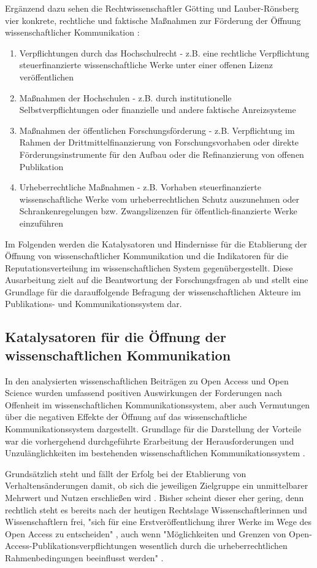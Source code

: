 Ergänzend dazu sehen die Rechtwissenschaftler Götting und Lauber-Rönsberg vier konkrete, rechtliche und faktische Maßnahmen zur Förderung der Öffnung wissenschaftlicher Kommunikation \cite{Goetting_2015}:
\begin{enumerate}
\item Verpflichtungen durch das Hochschulrecht - z.B. eine rechtliche Verpflichtung steuerfinanzierte wissenschaftliche Werke unter einer offenen Lizenz veröffentlichen
\item Maßnahmen der Hochschulen - z.B. durch institutionelle Selbstverpflichtungen oder finanzielle und andere faktische Anreizsysteme
\item Maßnahmen der öffentlichen Forschungsförderung - z.B. Verpflichtung im Rahmen der Drittmittelfinanzierung von Forschungsvorhaben oder direkte Förderungsinstrumente für den Aufbau oder die Refinanzierung von offenen Publikation
\item Urheberrechtliche Maßnahmen - z.B.  Vorhaben steuerfinanzierte wissenschaftliche Werke vom urheberrechtlichen Schutz auszunehmen oder Schrankenregelungen bzw. Zwangslizenzen für öffentlich-finanzierte Werke einzuführen
\end{enumerate}

Im Folgenden werden die Katalysatoren und Hindernisse für die Etablierung der Öffnung von wissenschaftlicher Kommunikation und die Indikatoren für die Reputationsverteilung im wissenschaftlichen System gegenübergestellt. Diese Ausarbeitung zielt auf die Beantwortung der Forschungsfragen ab und stellt eine Grundlage für die darauffolgende Befragung der wissenschaftlichen Akteure im Publikations- und Kommunikationssystem dar.

\subsection{Katalysatoren für die Öffnung der wissenschaftlichen Kommunikation}

In den analysierten wissenschaftlichen Beiträgen zu Open Access und Open Science wurden umfassend positiven Auswirkungen der Forderungen nach Offenheit im wissenschaftlichen Kommunikationssystem, aber auch Vermutungen über die negativen Effekte der Öffnung auf das wissenschaftliche Kommunikationssystem dargestellt. Grundlage für die Darstellung der Vorteile war die vorhergehend durchgeführte Erarbeitung der Herausforderungen und Unzulänglichkeiten im bestehenden wissenschaftlichen Kommunikationssystem \cite{cite:17}.

Grundsätzlich steht und fällt der Erfolg bei der Etablierung von Verhaltensänderungen damit, ob sich die jeweiligen Zielgruppe ein unmittelbarer Mehrwert und Nutzen erschließen wird \cite{schulze_2013_open}. Bisher scheint dieser eher gering, denn rechtlich steht es bereits nach der heutigen Rechtslage Wissenschaftlerinnen und Wissenschaftlern frei, "sich für eine Erstveröffentlichung ihrer Werke im Wege des Open Access zu entscheiden" \cite[:146]{Goetting_2015}, auch wenn "Möglichkeiten und Grenzen von Open-Access-Publikationsverpflichtungen wesentlich durch die urheberrechtlichen Rahmenbedingungen beeinflusst werden" \cite[:211]{Fehling_2014}.

